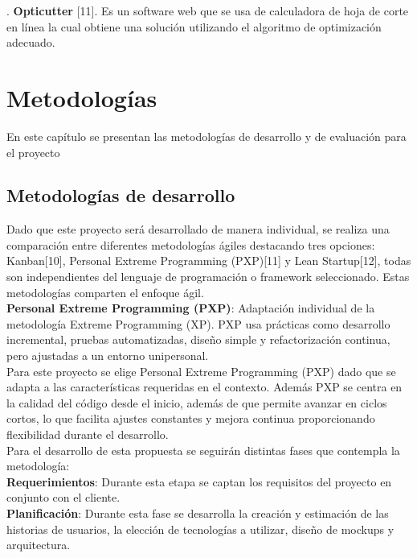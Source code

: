 \documentclass[12pt,oneside]{article}
\begin{document}
. \textbf{Opticutter} [11]. Es un software web que se usa de calculadora de hoja de corte en línea la cual obtiene una solución utilizando el algoritmo de optimización adecuado. 
\endgroup


\section{Metodologías}
En este capítulo se presentan las metodologías de desarrollo y de evaluación para
el proyecto
\begingroup
\subsection{Metodologías de desarrollo}
Dado que este proyecto será desarrollado de manera individual, se realiza una comparación entre diferentes metodologías ágiles destacando tres opciones: Kanban[10], Personal Extreme Programming (PXP)[11] y Lean Startup[12], todas son independientes del lenguaje de programación o framework seleccionado. Estas metodologías comparten el enfoque ágil.\\

\noindent \textbf{Personal Extreme Programming (PXP)}: Adaptación individual de la metodología Extreme Programming (XP). PXP usa prácticas como desarrollo incremental, pruebas automatizadas, diseño simple y refactorización continua, pero ajustadas a un entorno unipersonal.\\

\noindent Para este proyecto se elige Personal Extreme Programming (PXP) dado que se adapta a las características requeridas en el contexto. Además PXP se centra en la calidad del código desde el inicio, además de que permite avanzar en ciclos cortos, lo que facilita ajustes constantes y mejora continua proporcionando flexibilidad durante el desarrollo.\\

\noindent Para el desarrollo de esta propuesta se seguirán distintas fases que contempla la metodología:\\

\noindent \textbf{Requerimientos}: Durante esta etapa se captan los requisitos del proyecto en conjunto con el cliente.\\

\noindent \textbf{Planificación}: Durante esta fase se desarrolla la creación y estimación de las historias de usuarios, la elección de tecnologías a utilizar, diseño de mockups y arquitectura.\\
\end{document}
